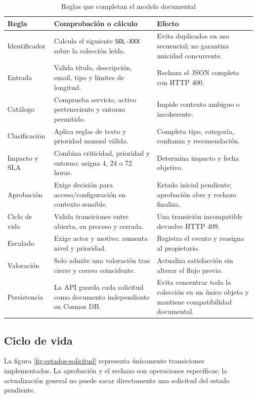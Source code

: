 \begin{table}[H]
\centering
\scriptsize
\begin{tabularx}{\textwidth}{l X X}
\textbf{Regla} & \textbf{Comprobación o cálculo} & \textbf{Efecto} \\
\hline
Identificador & Calcula el siguiente \texttt{SOL-XXX} sobre la colección leída. & Evita duplicados en uso secuencial; no garantiza unicidad concurrente. \\
Entrada & Valida título, descripción, email, tipo y límites de longitud. & Rechaza el JSON completo con HTTP 400. \\
Catálogo & Comprueba servicio, activo perteneciente y entorno permitido. & Impide contexto ambiguo o incoherente. \\
Clasificación & Aplica reglas de texto y prioridad manual válida. & Completa tipo, categoría, confianza y recomendación. \\
Impacto y SLA & Combina criticidad, prioridad y entorno; asigna 4, 24 o 72 horas. & Determina impacto y fecha objetivo. \\
Aprobación & Exige decisión para acceso/configuración en contexto sensible. & Estado inicial pendiente; aprobación abre y rechazo finaliza. \\
Ciclo de vida & Valida transiciones entre abierta, en proceso y cerrada. & Una transición incompatible devuelve HTTP 409. \\
Escalado & Exige actor y motivo; aumenta nivel y prioridad. & Registra el evento y reasigna al propietario. \\
Valoración & Solo admite una valoración tras cierre y correo coincidente. & Actualiza satisfacción sin alterar el flujo previo. \\
Persistencia & La API guarda cada solicitud como documento independiente en Cosmos DB. & Evita concentrar toda la colección en un único objeto y mantiene compatibilidad documental. \\
\end{tabularx}
\caption{Reglas que completan el modelo documental}
\label{tabla:reglas-modelo-documental}
\end{table}

\subsection{Ciclo de vida}

La figura \ref{fig:estados-solicitud} representa únicamente transiciones implementadas. La aprobación y el rechazo son operaciones específicas; la actualización general no puede sacar directamente una solicitud del estado pendiente.

